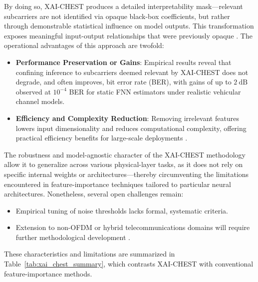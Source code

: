 \documentclass[11pt]{article}
\begin{document}
By doing so, XAI-CHEST produces a detailed interpretability mask—relevant subcarriers are not identified via opaque black-box coefficients, but rather through demonstrable statistical influence on model outputs. This transformation exposes meaningful input-output relationships that were previously opaque \cite{ref41}. The operational advantages of this approach are twofold:

\begin{itemize}
    \item \textbf{Performance Preservation or Gains}: Empirical results reveal that confining inference to subcarriers deemed relevant by XAI-CHEST does not degrade, and often improves, bit error rate (BER), with gains of up to \(2~\mathrm{dB}\) observed at \(10^{-4}\) BER for static FNN estimators under realistic vehicular channel models.
    \item \textbf{Efficiency and Complexity Reduction}: Removing irrelevant features lowers input dimensionality and reduces computational complexity, offering practical efficiency benefits for large-scale deployments \cite{ref41}.
\end{itemize}

The robustness and model-agnostic character of the XAI-CHEST methodology allow it to generalize across various physical-layer tasks, as it does not rely on specific internal weights or architectures—thereby circumventing the limitations encountered in feature-importance techniques tailored to particular neural architectures. Nonetheless, several open challenges remain:

\begin{itemize}
    \item Empirical tuning of noise thresholds lacks formal, systematic criteria.
    \item Extension to non-OFDM or hybrid telecommunications domains will require further methodological development \cite{ref38}.
\end{itemize}

These characteristics and limitations are summarized in Table~\ref{tab:xai_chest_summary}, which contrasts XAI-CHEST with conventional feature-importance methods.
\end{document}

